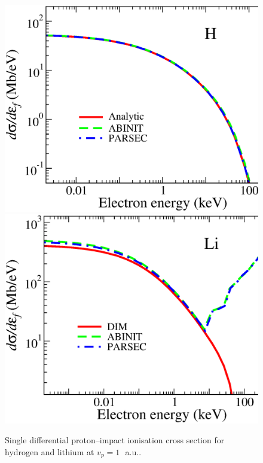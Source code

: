 \documentclass[10pt]{article}
\begin{document}
\begin{figure}[H]
\centering
 \includegraphics[height=0.225\textheight]{figures/pseudopot/ionizationH.eps}
 \hspace{0.2cm}
 \includegraphics[height=0.225\textheight]{figures/pseudopot/ionizationLi.eps}
 \caption{Single differential proton--impact ionisation cross 
 section for hydrogen and lithium at \mbox{$v_p=1$\, a.u..}}
 \label{fig:ionHLi}
\end{figure}

\end{document}
